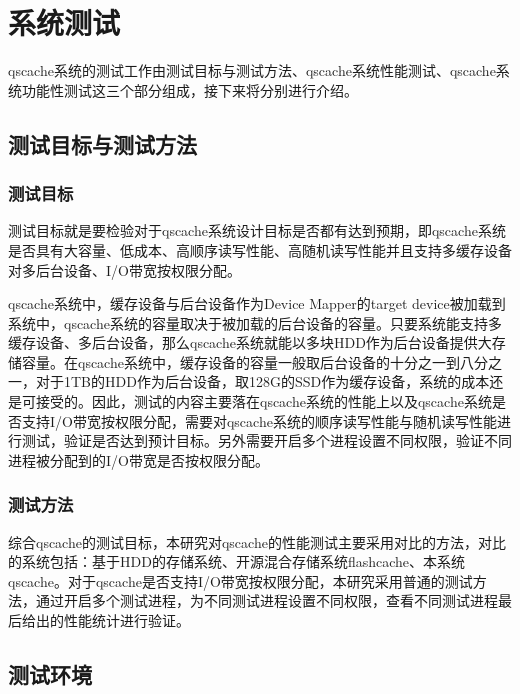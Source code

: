 
\chapter{系统测试}
\label{chap:sys_test}

qscache系统的测试工作由测试目标与测试方法、qscache系统性能测试、qscache系统功能性测试这三个部分组成，接下来将分别进行介绍。

\section{测试目标与测试方法}

\subsection{测试目标}

测试目标就是要检验对于qscache系统设计目标是否都有达到预期，即qscache系统是否具有大容量、低成本、高顺序读写性能、高随机读写性能并且支持多缓存设备对多后台设备、I/O带宽按权限分配。

qscache系统中，缓存设备与后台设备作为Device Mapper的target device被加载到系统中，qscache系统的容量取决于被加载的后台设备的容量。只要系统能支持多缓存设备、多后台设备，那么qscache系统就能以多块HDD作为后台设备提供大存储容量。在qscache系统中，缓存设备的容量一般取后台设备的十分之一到八分之一，对于1TB的HDD作为后台设备，取128G的SSD作为缓存设备，系统的成本还是可接受的。因此，测试的内容主要落在qscache系统的性能上以及qscache系统是否支持I/O带宽按权限分配，需要对qscache系统的顺序读写性能与随机读写性能进行测试，验证是否达到预计目标。另外需要开启多个进程设置不同权限，验证不同进程被分配到的I/O带宽是否按权限分配。

\subsection{测试方法}

综合qscache的测试目标，本研究对qscache的性能测试主要采用对比的方法，对比的系统包括：基于HDD的存储系统、开源混合存储系统flashcache、本系统qscache。对于qscache是否支持I/O带宽按权限分配，本研究采用普通的测试方法，通过开启多个测试进程，为不同测试进程设置不同权限，查看不同测试进程最后给出的性能统计进行验证。

\section{测试环境}

